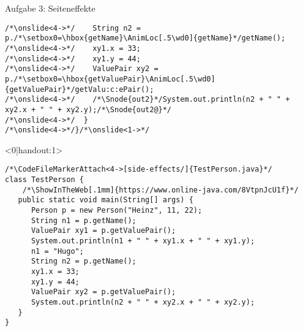 {\begin{frame}[fragile,t]{Aufgabe 3: Seiteneffekte}
\begin{onlyenv}
\begin{verbatim}
/*\onslide<4->*/    String n2 = p./*\setbox0=\hbox{getName}\AnimLoc[.5\wd0]{getName}*/getName();
/*\onslide<4->*/    xy1.x = 33;
/*\onslide<4->*/    xy1.y = 44;
/*\onslide<4->*/    ValuePair xy2 = p./*\setbox0=\hbox{getValuePair}\AnimLoc[.5\wd0]{getValuePair}*/getValu:c:ePair();
/*\onslide<4->*/    /*\Snode{out2}*/System.out.println(n2 + " " + xy2.x + " " + xy2.y);/*\Snode{out2@}*/
/*\onslide<4->*/  }
/*\onslide<4->*/}/*\onslide<1->*/
\end{verbatim}
\endAnimateCode{}
\end{onlyenv}
\begin{onlyenv}<0|handout:1>
\begin{verbatim}
/*\CodeFileMarkerAttach<4->[side-effects/]{TestPerson.java}*/
class TestPerson {
    /*\ShowInTheWeb[.1mm]{https://www.online-java.com/8VtpnJcU1f}*/
   public static void main(String[] args) {
      Person p = new Person("Heinz", 11, 22);
      String n1 = p.getName();
      ValuePair xy1 = p.getValuePair();
      System.out.println(n1 + " " + xy1.x + " " + xy1.y);
      n1 = "Hugo";
      String n2 = p.getName();
      xy1.x = 33;
      xy1.y = 44;
      ValuePair xy2 = p.getValuePair();
      System.out.println(n2 + " " + xy2.x + " " + xy2.y);
   }
}
\end{verbatim}
\end{onlyenv}
\endcolumns%
\end{frame}}
